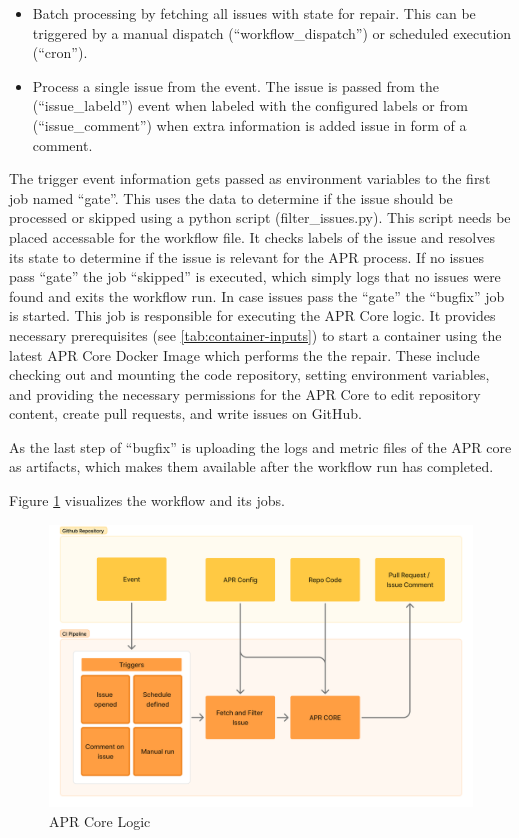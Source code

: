 \begin{itemize}
    \item Batch processing by fetching all issues with state for repair. This can be triggered by a manual dispatch (``workflow\_dispatch'') or scheduled execution (``cron'').
    \item Process a single issue from the event. The issue is passed from the (``issue\_labeld'') event when labeled with the configured labels or from (``issue\_comment'') when extra information is added issue in form of a comment.
\end{itemize}

The trigger event information gets passed as environment variables to the first job named ``gate''. This uses the data to determine if the issue should be processed or skipped using a python script (filter\_issues.py). This script needs be placed accessable for the workflow file. It checks labels of the issue and resolves its state to determine if the issue is relevant for the APR process. If no issues pass ``gate'' the job ``skipped'' is executed, which simply logs that no issues were found and exits the workflow run. In case issues  pass the ``gate'' the ``bugfix'' job is started. This job is responsible for executing the APR Core logic. It provides necessary prerequisites (see \ref{tab:container-inputs}) to start a container using the latest APR Core Docker Image which performs the the repair. These include checking out and mounting the code repository, setting environment variables, and providing the necessary permissions for the APR Core to edit repository content, create pull requests, and write issues on GitHub.

As the last step of ``bugfix'' is uploading the logs and metric files of the APR core as artifacts, which makes them available after the workflow run has completed.

Figure \ref{fig:ci} visualizes the workflow and its jobs.

\begin{figure}[H]
    \centering
    \includegraphics[width=1\textwidth]{images/flowcharts/ci.png}
    \caption{APR Core Logic}
    \label{fig:ci}
\end{figure}

